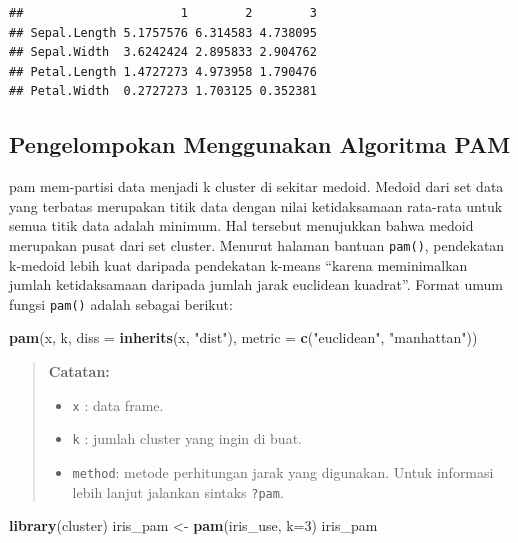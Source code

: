 \documentclass[]{book}
\newenvironment{Shaded}{\begin{snugshade}}{\end{snugshade}}
\newcommand{\DataTypeTok}[1]{\textcolor[rgb]{0.13,0.29,0.53}{#1}}
\newcommand{\DecValTok}[1]{\textcolor[rgb]{0.00,0.00,0.81}{#1}}
\newcommand{\KeywordTok}[1]{\textcolor[rgb]{0.13,0.29,0.53}{\textbf{#1}}}
\newcommand{\NormalTok}[1]{#1}
\newcommand{\StringTok}[1]{\textcolor[rgb]{0.31,0.60,0.02}{#1}}
\providecommand{\tightlist}{%
  \setlength{\itemsep}{0pt}\setlength{\parskip}{0pt}}
\theoremstyle{definition}
\theoremstyle{definition}
\theoremstyle{definition}
\theoremstyle{remark}
\begin{document}
\begin{verbatim}
##                      1        2        3
## Sepal.Length 5.1757576 6.314583 4.738095
## Sepal.Width  3.6242424 2.895833 2.904762
## Petal.Length 1.4727273 4.973958 1.790476
## Petal.Width  0.2727273 1.703125 0.352381
\end{verbatim}

\hypertarget{pengelompokan-menggunakan-algoritma-pam}{%
\subsection{Pengelompokan Menggunakan Algoritma PAM}\label{pengelompokan-menggunakan-algoritma-pam}}

pam mem-partisi data menjadi k cluster di sekitar medoid. Medoid dari set data yang terbatas merupakan titik data dengan nilai ketidaksamaan rata-rata untuk semua titik data adalah minimum. Hal tersebut menujukkan bahwa medoid merupakan pusat dari set cluster. Menurut halaman bantuan \texttt{pam()}, pendekatan k-medoid lebih kuat daripada pendekatan k-means ``karena meminimalkan jumlah ketidaksamaan daripada jumlah jarak euclidean kuadrat''. Format umum fungsi \texttt{pam()} adalah sebagai berikut:

\begin{Shaded}
\begin{Highlighting}[]
\KeywordTok{pam}\NormalTok{(x, k, }\DataTypeTok{diss =} \KeywordTok{inherits}\NormalTok{(x, }\StringTok{"dist"}\NormalTok{),}
    \DataTypeTok{metric =} \KeywordTok{c}\NormalTok{(}\StringTok{"euclidean"}\NormalTok{, }\StringTok{"manhattan"}\NormalTok{))}
\end{Highlighting}
\end{Shaded}

\begin{quote}
\textbf{Catatan:}

\begin{itemize}
\tightlist
\item
  \texttt{x} : data frame.
\item
  \texttt{k} : jumlah cluster yang ingin di buat.
\item
  \texttt{method}: metode perhitungan jarak yang digunakan. Untuk informasi lebih lanjut jalankan sintaks \texttt{?pam}.
\end{itemize}
\end{quote}

\begin{Shaded}
\begin{Highlighting}[]
\KeywordTok{library}\NormalTok{(cluster)}
\NormalTok{iris_pam <-}\StringTok{ }\KeywordTok{pam}\NormalTok{(iris_use, }\DataTypeTok{k=}\DecValTok{3}\NormalTok{)}
\NormalTok{iris_pam}
\end{Highlighting}
\end{Shaded}
\end{document}
